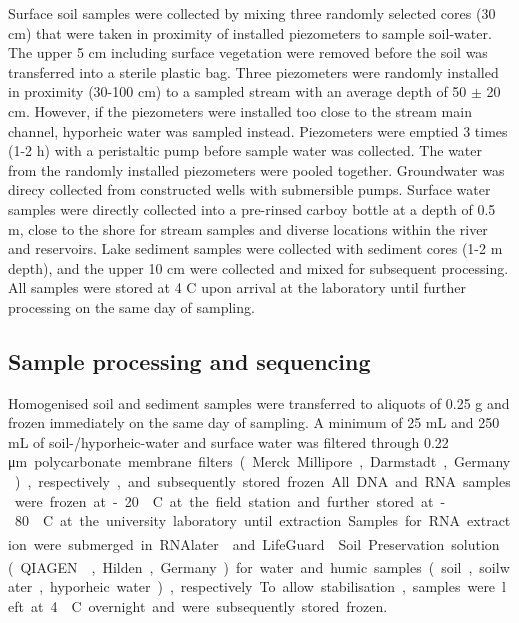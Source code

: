 \documentclass[12pt,a4paper]{article} %
\begin{document}
Surface soil samples were collected by mixing three randomly selected cores (30 cm) that were taken in proximity of installed piezometers to sample soil-water. The upper 5 cm including surface vegetation were removed before the soil was transferred into a sterile plastic bag. Three piezometers were randomly installed in proximity (30-100 cm) to a sampled stream with an average depth of 50 $\pm$ 20 cm. However, if the piezometers were installed too close to the stream main channel, hyporheic water was sampled instead. Piezometers were emptied 3 times (1-2 h) with a peristaltic pump before sample water was collected. The water from the randomly installed piezometers were pooled together. Groundwater was direcy collected from constructed wells with submersible pumps. Surface water samples were directly collected into a pre-rinsed carboy bottle at a depth of 0.5 m, close to the shore for stream samples and diverse locations within the river and reservoirs. Lake sediment samples were collected with sediment cores (1-2 m depth), and the upper 10 cm were collected and mixed for subsequent processing. All samples were stored at 4 \textdegree{}C upon arrival at the laboratory until further processing on the same day of sampling.

\subsection*{Sample processing and sequencing}
Homogenised soil and sediment samples were transferred to aliquots of 0.25 g and frozen immediately on the same day of sampling. A minimum of 25 mL and 250 mL of soil-/hyporheic-water and surface water was filtered through 0.22 \si\micro m polycarbonate membrane filters (Merck Millipore, Darmstadt, Germany), respectively, and subsequently stored frozen. All DNA and RNA samples were frozen at -20 \textdegree{}C at the field station and further stored at -80 \textdegree{}C at the university laboratory until extraction. Samples for RNA extraction were submerged in RNAlater\textsuperscript{\textregistered} and LifeGuard\textsuperscript{\textregistered} Soil Preservation solution (QIAGEN\textsuperscript{\textregistered}, Hilden, Germany) for water and humic samples (soil, soilwater, hyporheic water), respectively. To allow stabilisation, samples were left at 4 \textdegree{}C overnight and were subsequently stored frozen.
\end{document}
